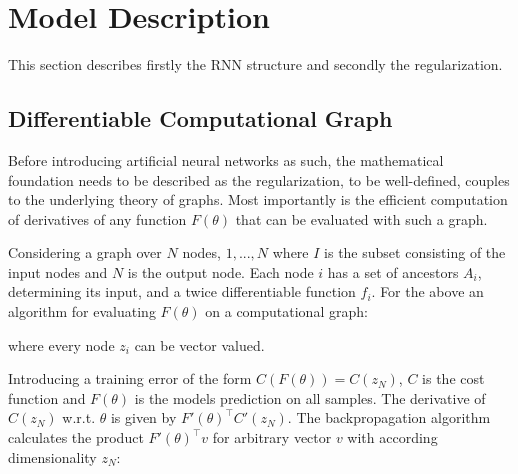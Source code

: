 \chapter{Model Description}

This section describes firstly the RNN structure and secondly the regularization.

\section{Differentiable Computational Graph}

Before introducing artificial neural networks as such, the mathematical foundation needs to be described as the regularization, to be well-defined, couples to the underlying theory of graphs. Most importantly is the efficient computation of derivatives of any function $F(\theta)$ that can be evaluated with such a graph. 

Considering a graph over $N$ nodes, $1, ..., N$ where $I$ is the subset consisting of the input nodes and $N$ is the output node. Each node $i$ has a set of ancestors $A_i$, determining its input, and a twice differentiable function $f_i$. For the above an algorithm for evaluating $F(\theta)$ on a computational graph:

\begin{algorithmic}[1]
    \EndFor
\end{algorithmic}

where every node $z_i$ can be vector valued.

Introducing a training error of the form $C(F(\theta)) = C(z_N)$, $C$ is the cost function and $F(\theta)$ is the models prediction on all samples. The derivative of $C(z_N)$ w.r.t. $\theta$ is given by $F'(\theta)^\top C'(z_N)$. The backpropagation algorithm calculates the product $F'(\theta)^\top v$ for arbitrary vector $v$ with according dimensionality $z_N$:

\begin{algorithmic}[1]
    \EndFor
    \EndFor
\end{algorithmic}

